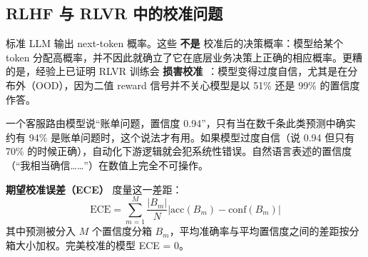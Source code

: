 \subsection{RLHF 与 RLVR 中的校准问题}
\label{subsec:calibration-problem}

标准 LLM 输出 next-token 概率。这些 \textbf{不是} 校准后的决策概率：模型给某个 token 分配高概率，并不因此就确立了它在底层业务决策上正确的相应概率。更糟的是，经验上已证明 RLVR 训练会 \textbf{损害校准}~\cite{damani2025rlcr}：模型变得过度自信，尤其是在分布外（OOD），因为二值 reward 信号并不关心模型是以 51\% 还是 99\% 的置信度作答。

\begin{keybox}[为什么校准对自动化至关重要]
一个客服路由模型说“账单问题，置信度 0.94”，只有当在数千条此类预测中确实约有 94\% 是账单问题时，这个说法才有用。如果模型过度自信（说 0.94 但只有 70\% 的时候正确），自动化下游逻辑就会犯系统性错误。自然语言表述的置信度（“我相当确信……”）在数值上完全不可操作。
\end{keybox}

\textbf{期望校准误差（ECE）} 度量这一差距：
\begin{equation}
\mathrm{ECE} = \sum_{m=1}^{M} \frac{|B_m|}{N} \left| \mathrm{acc}(B_m) - \mathrm{conf}(B_m) \right|
\end{equation}
其中预测被分入 $M$ 个置信度分箱 $B_m$，平均准确率与平均置信度之间的差距按分箱大小加权。完美校准的模型 ECE = 0。

